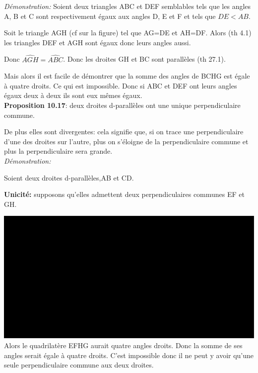 \documentclass[a4paper, 12pt, twoside]{book}
\begin{document}
 \textit{Démonstration:} Soient deux triangles ABC et DEF semblables tels que les angles A, B et C sont respectivement égaux aux angles D, E et F et tels que $DE<AB$.\
 
 Soit le triangle AGH (cf sur la figure) tel que AG=DE et AH=DF. Alors (th 4.1) les triangles DEF et AGH sont égaux donc leurs angles aussi. \
 
 Donc $\hat{AGH}=\hat{ABC}$. Donc les droites GH et BC sont parallèles (th 27.1).\
 
 Mais alors il est facile de démontrer que la somme des angles de BCHG est égale à quatre droits. Ce qui est impossible. Donc si ABC et DEF ont leurs angles égaux deux à deux ils sont eux mêmes égaux.\\
 
 
 
 
\textbf{Proposition 10.17}: deux droites d-parallèles ont une unique perpendiculaire commune.\

De plus elles sont divergentes: cela signifie que, si on trace une perpendiculaire d'une des droites sur l'autre, plus on s'éloigne de la perpendiculaire commune et plus la perpendiculaire sera grande.\\

 
\textit{Démonstration:} \

Soient deux droites d-parallèles,AB et CD.\
 

\textbf{Unicité:} supposons qu'elles admettent deux perpendiculaires communes EF et GH.\


  
 \includegraphics[scale=0.1]{figures/Lobat26.eps}\\ 
 
 Alors le quadrilatère EFHG aurait quatre angles droits. Donc la somme de ses angles serait égale à quatre droits. C'est impossible donc il ne peut y avoir qu'une seule perpendiculaire commune aux deux droites.\\
 
\end{document}

